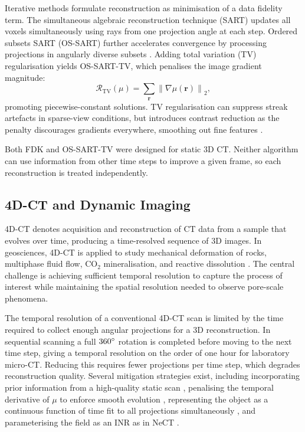 \documentclass[12pt, a4paper, twoside]{report}
\begin{document}
Iterative methods formulate reconstruction as minimisation of a data fidelity term. The simultaneous algebraic reconstruction technique (SART) \citep{gordon1970algebraic, andersen1984sart} updates all voxels simultaneously using rays from one projection angle at each step. Ordered subsets SART (OS-SART) further accelerates convergence by processing projections in angularly diverse subsets \citep{du2017convergence}. Adding total variation (TV) regularisation yields OS-SART-TV, which penalises the image gradient magnitude:
%
\begin{equation}
    \mathcal{R}_\mathrm{TV}(\mu) = \sum_{\mathbf{r}}
        \left\|\nabla \mu(\mathbf{r})\right\|_2,
    \label{eq:tv_regularisation}
\end{equation}
%
promoting piecewise-constant solutions. TV regularisation can suppress streak artefacts in sparse-view conditions, but introduces contrast reduction as the penalty discourages gradients everywhere, smoothing out fine features \citep{kak2001principles}.

Both FDK and OS-SART-TV were designed for static 3D CT. Neither algorithm can use information from other time steps to improve a given frame, so each reconstruction is treated independently.

\subsection{4D-CT and Dynamic Imaging}
\label{subsec:4dct}

4D-CT denotes acquisition and reconstruction of CT data from a sample that evolves over time, producing a time-resolved sequence of 3D images. In geosciences, 4D-CT is applied to study mechanical deformation of rocks, multiphase fluid flow, CO$_2$ mineralisation, and reactive dissolution \citep{withers2021ct, gan2020application}. The central challenge is achieving sufficient temporal resolution to capture the process of interest while maintaining the spatial resolution needed to observe pore-scale phenomena.

The temporal resolution of a conventional 4D-CT scan is limited by the time required to collect enough angular projections for a 3D reconstruction. In sequential scanning a full $360\degree$ rotation is completed before moving to the next time step, giving a temporal resolution on the order of one hour for laboratory micro-CT. Reducing this requires fewer projections per time step, which degrades reconstruction quality. Several mitigation strategies exist, including incorporating prior information from a high-quality static scan \citep{chen2008piccs, myers2011dynamic}, penalising the temporal derivative of $\mu$ to enforce smooth evolution \citep{goethals2022dynamic}, representing the object as a continuous function of time fit to all projections simultaneously \citep{goethals2025dyrect}, and parameterising the field as an INR as in NeCT \citep{friis2025nect}.
\end{document}
